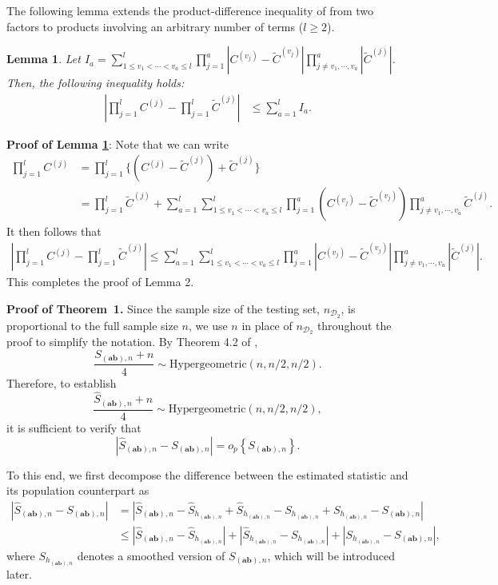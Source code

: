 \documentclass[12pt,reqno,oneside]{amsbook}
\newtheorem{lemma}[theorem]{Lemma}
\theoremstyle{definition}
\theoremstyle{remark}
\begin{document}
The following lemma extends the product-difference inequality of \cite{Bickel_2008} from two factors to products involving an arbitrary number of terms ($l\ge2$).

\begin{lemma}
\label{lemma2}
Let $I_a=\sum_{1\leq v_1<\cdots<v_a\leq l}^l\prod_{j=1}^a |C^{(v_j)}-\tilde{C}^{(v_j)}| 
\prod_{j\neq v_1,\cdots, v_a}^a |\tilde{C}^{(j)}|$. Then, the following inequality holds: 
\begin{align*}
\left|\prod_{j=1}^l C^{(j)}-\prod_{j=1}^l \tilde{C}^{(j)} \right| &\le \sum_{a=1}^l I_a. 
\end{align*}
\end{lemma}


\textbf{Proof of Lemma \ref{lemma2}}: Note that we can write 
\begin{align*}
\prod_{j=1}^l C^{(j)}&= \prod_{j=1}^l \{(C^{(j)}-\tilde{C}^{(j)}) + \tilde{C}^{(j)}\}\\
&= \prod_{j=1}^l\tilde{C}^{(j)} +\sum_{a=1}^l \sum_{1\leq v_1<\cdots<v_a\leq l}^l\prod_{j=1}^a (C^{(v_j)}-\tilde{C}^{(v_j)}) 
\prod_{j\neq v_1,\cdots, v_a}^a \tilde{C}^{(j)}.
\end{align*}
It then follows that
\begin{align*}
\left|\prod_{j=1}^l C^{(j)}-\prod_{j=1}^l \tilde{C}^{(j)} \right|\leq \sum_{a=1}^l \sum_{1\leq v_1<\cdots<v_a\leq l}^l\prod_{j=1}^a |C^{(v_j)}-\tilde{C}^{(v_j)}| 
\prod_{j\neq v_1,\cdots, v_a}^a |\tilde{C}^{(j)}|.
\end{align*}
This completes the proof of Lemma 2.



\textbf{Proof of Theorem~1.}
Since the sample size of the testing set, $n_{\mathcal{D}_2}$, is proportional to the full sample size $n$, we use $n$ in place of $n_{\mathcal{D}_2}$ throughout the proof to simplify the notation. By Theorem 4.2 of \cite{zhang2019bet},
\[
\frac{S_{(\mathbf{ab}),n}+n}{4}
\sim
\mathrm{Hypergeometric}(n,n/2,n/2).
\]
Therefore, to establish
\[
\frac{\hat{S}_{(\mathbf{ab}),n}+n}{4}
\sim
\mathrm{Hypergeometric}(n,n/2,n/2),
\]
it is sufficient to verify that
\[
|\hat{S}_{(\mathbf{ab}),n}-S_{(\mathbf{ab}),n}|
=
o_p\!\left\{S_{(\mathbf{ab}),n}\right\}.
\]

To this end, we first decompose the difference between the estimated statistic and its population counterpart as
\begin{align*}
|\hat{S}_{(\mathbf{ab}),n}-S_{(\mathbf{ab}),n}|
&=
|\hat{S}_{(\mathbf{ab}),n}-\hat{S}_{h_{(\mathbf{ab}),n}}
+\hat{S}_{h_{(\mathbf{ab}),n}}
-S_{h_{(\mathbf{ab}),n}}
+S_{h_{(\mathbf{ab}),n}}
-S_{(\mathbf{ab}),n}|\\
&\le
|\hat{S}_{(\mathbf{ab}),n}-\hat{S}_{h_{(\mathbf{ab}),n}}|
+
|\hat{S}_{h_{(\mathbf{ab}),n}}
-S_{h_{(\mathbf{ab}),n}}|
+
|S_{h_{(\mathbf{ab}),n}}
-S_{(\mathbf{ab}),n}|,
\end{align*}
where $S_{h_{(\mathbf{ab}),n}}$ denotes a smoothed version of
$S_{(\mathbf{ab}),n}$, which will be introduced later.
\end{document}
